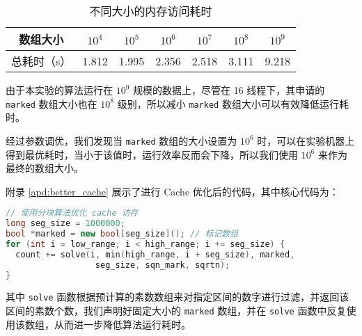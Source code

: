 \documentclass[11pt]{article}
\begin{document}
  \begin{table}[h]
    \centering
    \caption{不同大小的内存访问耗时}
    \label{tab:mem}
    \begin{tabular}{ccccccc}
      \hline
      数组大小 & $10^4$ & $10^5$ & $10^6$ & $10^7$ & $10^8$ & $10^9$ \\
      \hline
      总耗时（s） & 1.812 & 1.995 & 2.356 & 2.518 & 3.111 & 9.218 \\
      \hline
    \end{tabular}
  \end{table}

  由于本实验的算法运行在 $10^9$ 规模的数据上，尽管在 16 线程下，其申请的 \verb|marked| 数组大小也在 $10^8$ 级别，所以减小 \verb|marked| 数组大小可以有效降低运行耗时。

  经过参数调优，我们发现当 \verb|marked| 数组的大小设置为 $10^6$ 时，可以在实验机器上得到最优耗时，当小于该值时，运行效率反而会下降，所以我们使用 $10^6$ 来作为最终的数组大小。

  附录 \ref{apd:better_cache} 展示了进行 Cache 优化后的代码，其中核心代码为：

  \begin{file}
    \begin{lstlisting}[language=C++]
// 使用分块算法优化 cache 访存
long seg_size = 1000000;
bool *marked = new bool[seg_size](); // 标记数组
for (int i = low_range; i < high_range; i += seg_size) {
  count += solve(i, min(high_range, i + seg_size), marked,
                  seg_size, sqn_mark, sqrtn);
}
  \end{lstlisting}
  \end{file}

  其中 \verb|solve| 函数根据预计算的素数数组来对指定区间的数字进行过滤，并返回该区间的素数个数，我们声明好固定大小的 \verb|marked| 数组，并在 \verb|solve| 函数中反复使用该数组，从而进一步降低算法运行耗时。
\end{document}

